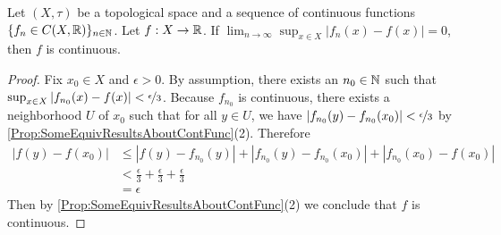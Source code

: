 \documentclass[screen]{techreport}
\numberwithin{equation}{section}
\begin{document}
\begin{lemma}\label{Lem:UniformContinuous}
	Let $(X,\tau)$ be a topological space and a sequence of continuous functions $\{f_n \in C(X,\mathbb{R})\}_{n \in \mathbb{N}}$.
	Let $f : X \to \mathbb{R}$.
	If $\lim_{n \to \infty} \sup_{x \in X} |f_n(x) - f(x)| = 0$, then $f$ is continuous.
\end{lemma}
\begin{proof}
	Fix $x_0 \in X$ and $\epsilon > 0$.
	By assumption, there exists an $n_0 \in \mathbb{N}$ such that $\sup_{x \in X} |f_{n_0}(x) - f(x)| < \nicefrac{\epsilon}{3}$.
	Because $f_{n_0}$ is continuous, there exists a neighborhood $U$ of $x_0$ such that for all $y \in U$, we have $|f_{n_0}(y) - f_{n_0}(x_0)| < \nicefrac{\epsilon}{3}$ by \cref{Prop:SomeEquivResultsAboutContFunc}(2).
	Therefore
	\begin{align*}
		|f(y) - f(x_0)| & \le |f(y) - f_{n_0}(y)| + |f_{n_0}(y) - f_{n_0}(x_0)| + |f_{n_0}(x_0) - f(x_0)| \\
		& < \frac{\epsilon}{3} + \frac{\epsilon}{3} + \frac{\epsilon}{3} \\
		& = \epsilon
	\end{align*}
	Then by \cref{Prop:SomeEquivResultsAboutContFunc}(2) we conclude that $f$ is continuous.
\end{proof}
\end{document}

